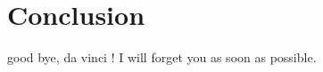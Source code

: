 \chapter{Conclusion}\label{cha:conclusion}

good bye, da vinci ! I will forget you as soon as possible.